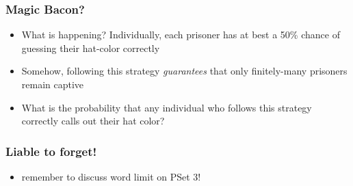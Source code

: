 \begin{frame}
\frametitle{Magic Bacon?}

\begin{itemize}[<+->]
\item What is happening? Individually, each prisoner has at best a 50\% chance of guessing their hat-color correctly

\item Somehow, following this strategy \textit{guarantees} that only finitely-many prisoners remain captive

\item What is the probability that any individual who follows this strategy correctly calls out their hat color?


\end{itemize}
\end{frame}



\begin{frame}
  \frametitle{Liable to forget!}

      \begin{itemize}[<+->]
        \item remember to discuss word limit on PSet 3!

      
      \end{itemize}
   
\end{frame}



















